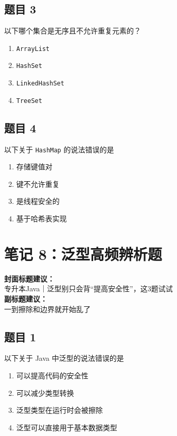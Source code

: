 \documentclass[12pt,a4paper]{ctexart}
\begin{document}
\subsection*{题目 3}
以下哪个集合是无序且不允许重复元素的？
\begin{enumerate}[label=\Alph*.]
    \item \texttt{ArrayList}
    \item \texttt{HashSet}
    \item \texttt{LinkedHashSet}
    \item \texttt{TreeSet}
\end{enumerate}

\subsection*{题目 4}
以下关于 \texttt{HashMap} 的说法错误的是
\begin{enumerate}[label=\Alph*.]
    \item 存储键值对
    \item 键不允许重复
    \item 是线程安全的
    \item 基于哈希表实现
\end{enumerate}

\newpage

\section{笔记 8：泛型高频辨析题}
\begin{coverbox}
\textbf{封面标题建议：}\\
专升本Java｜泛型别只会背“提高安全性”，这3题试试\\
\textbf{副标题建议：}\\
一到擦除和边界就开始乱了
\end{coverbox}

\subsection*{题目 1}
以下关于 Java 中泛型的说法错误的是
\begin{enumerate}[label=\Alph*.]
    \item 可以提高代码的安全性
    \item 可以减少类型转换
    \item 泛型类型在运行时会被擦除
    \item 泛型可以直接用于基本数据类型
\end{enumerate}
\end{document}
